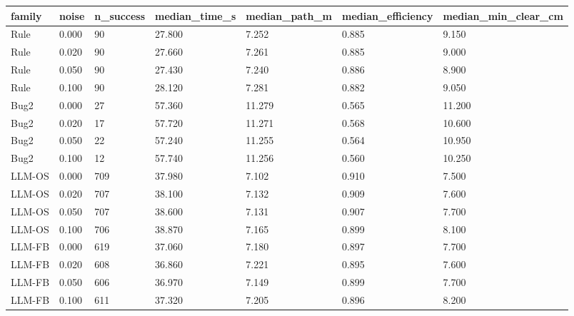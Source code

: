 \begin{tabular}{lllllll}
\hline
family & noise & n\_success & median\_time\_s & median\_path\_m & median\_efficiency & median\_min\_clear\_cm \\
\hline
Rule & 0.000 & 90 & 27.800 & 7.252 & 0.885 & 9.150 \\
Rule & 0.020 & 90 & 27.660 & 7.261 & 0.885 & 9.000 \\
Rule & 0.050 & 90 & 27.430 & 7.240 & 0.886 & 8.900 \\
Rule & 0.100 & 90 & 28.120 & 7.281 & 0.882 & 9.050 \\
Bug2 & 0.000 & 27 & 57.360 & 11.279 & 0.565 & 11.200 \\
Bug2 & 0.020 & 17 & 57.720 & 11.271 & 0.568 & 10.600 \\
Bug2 & 0.050 & 22 & 57.240 & 11.255 & 0.564 & 10.950 \\
Bug2 & 0.100 & 12 & 57.740 & 11.256 & 0.560 & 10.250 \\
LLM-OS & 0.000 & 709 & 37.980 & 7.102 & 0.910 & 7.500 \\
LLM-OS & 0.020 & 707 & 38.100 & 7.132 & 0.909 & 7.600 \\
LLM-OS & 0.050 & 707 & 38.600 & 7.131 & 0.907 & 7.700 \\
LLM-OS & 0.100 & 706 & 38.870 & 7.165 & 0.899 & 8.100 \\
LLM-FB & 0.000 & 619 & 37.060 & 7.180 & 0.897 & 7.700 \\
LLM-FB & 0.020 & 608 & 36.860 & 7.221 & 0.895 & 7.600 \\
LLM-FB & 0.050 & 606 & 36.970 & 7.149 & 0.899 & 7.700 \\
LLM-FB & 0.100 & 611 & 37.320 & 7.205 & 0.896 & 8.200 \\
\hline
\end{tabular}
